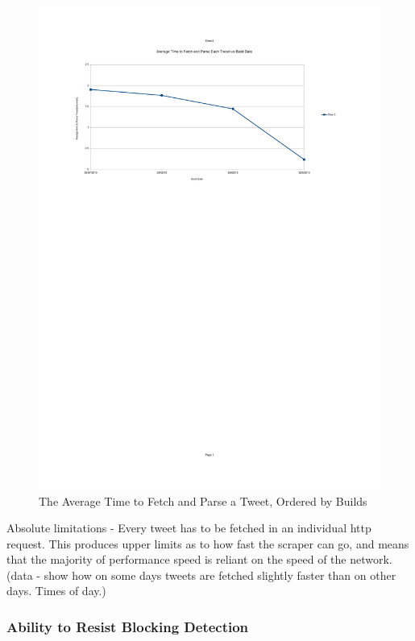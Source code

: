 \begin{figure}[h!]
\centering
\includegraphics{Images/average_time_to_fetch_parse_tweets_per_build.pdf}
\caption{The Average Time to Fetch and Parse a Tweet, Ordered by Builds}
\end{figure}

Absolute limitations - Every tweet has to be fetched in an individual http request. This produces upper limits as to how fast the scraper can go, and means that the majority of performance speed is reliant on the speed of the network. (data - show how on some days tweets are fetched slightly faster than on other days. Times of day.)


\subsubsection{Ability to Resist Blocking Detection}

